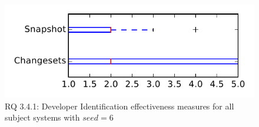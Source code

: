 
\begin{figure}
\centering
\includegraphics[height=0.4\textheight]{figures/dit_seed/rq1_tiny_6}
\caption{RQ 3.4.1: Developer Identification effectiveness measures for all subject systems with $seed=6$}
\label{fig:dit_seed:rq1:tiny}
\end{figure}
